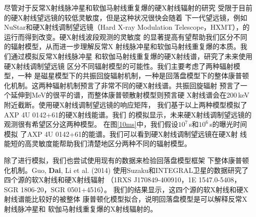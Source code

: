 尽管对于反常X射线脉冲星和软伽马射线重复爆的硬X射线辐射的研究
受限于目前的硬X射线望远镜的较低灵敏度，但是这种状况很快会随着
下一代望远镜，例如NuStar和硬X射线调制望远镜（Hard X-ray Modulation 
Telescope，HXMT），的运行而得到改变。硬X射线波段观测的灵敏度
的显著提高有望帮助我们区分不同的辐射模型，从而进一步理解反常X
射线脉冲星和软伽马射线重复爆的本质。我们通过模拟反常X射线脉冲星
和软伽马射线重复爆的硬X射线谱，研究了未来使用硬X射线调制望远镜
区分不同辐射模型的可能性。我们主要考虑了两种辐射模型，一种
是磁星模型下的共振回旋辐射机制，一种是回落盘模型下的整体康普顿
化机制。这两种辐射机制预言了非常不同的硬X射线谱。共振回旋辐射
预言了一个延伸到MeV的很平的谱，而整体康普顿散射模型则预言硬
X射线谱会在200\,keV附近截断。使用硬X射线调制望远镜的响应矩阵，
我们基于以上两种模型模拟了AXP 4U 0142+61的硬X射线能谱。我们
的模拟显示，未来硬X射线调制望远镜的观测很有希望区分这两种模型。
在图\ref{10ms}中，我们假设$10^7$\,s和$10^6$\,s的曝光时间模拟
了AXP 4U 0142+61的能谱。我们可以看到硬X射线调制望远镜在硬X射
线能短的高灵敏度能帮助我们清楚地区分两种不同的辐射模型。

除了进行模拟，我们也尝试使用现有的数据来检验回落盘模型框架
下整体康普顿化机制。Guo, \textbf{Dai}, Li et al. (2014)\supercite{gdl+14}
使用Suzaku和INTEGRAL卫星的数据研究了四个源的软X射线和硬X射线辐射
（1RXS J170849-400910，1E 1547.0-5408，SGR 1806-20，SGR 0501+4516）。
我们的结果显示，这四个源的软X射线和硬X射线谱能比较好的被整体
康普顿化模型拟合，说明回落盘模型是可以解释反常X射线脉冲星和
软伽马射线重复爆的X射线辐射的。

